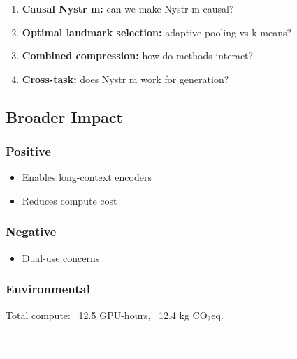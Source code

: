 \begin{enumerate}
\item \textbf{Causal Nystr m:} can we make Nystr m causal?
\item \textbf{Optimal landmark selection:} adaptive pooling vs k-means?
\item \textbf{Combined compression:} how do methods interact?
\item \textbf{Cross-task:} does Nystr m work for generation?

\end{enumerate}
\subsection{Broader Impact}

\subsubsection{Positive}
\begin{itemize}
\item Enables long-context encoders
\item Reduces compute cost

\end{itemize}
\subsubsection{Negative}
\begin{itemize}
\item Dual-use concerns

\end{itemize}
\subsubsection{Environmental}
Total compute: ~12.5 GPU-hours, ~12.4 kg CO$_2$eq.
\begin{lstlisting}

---
\end{lstlisting}